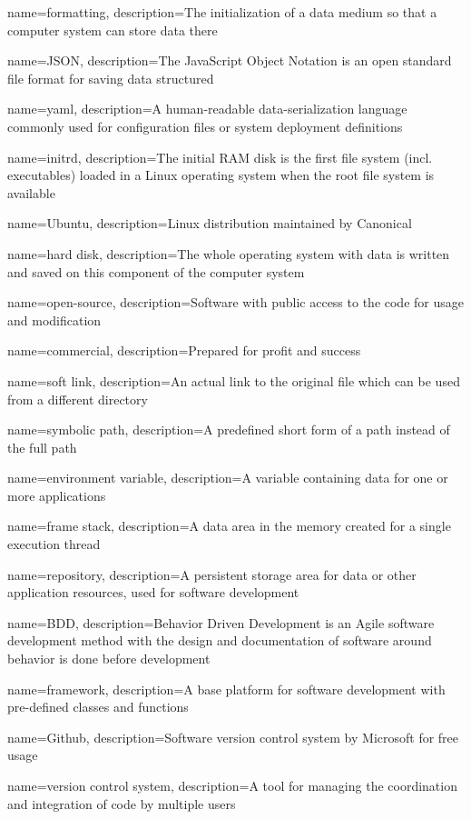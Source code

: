{
    name={formatting},
    description={The initialization of a data medium so that a computer system can store data there}
}

{
    name={JSON},
    description={The JavaScript Object Notation is an open standard file format for saving data structured}
}

{
    name={yaml},
    description={A human-readable data-serialization language commonly used for configuration files or system deployment definitions}
}

{
    name={initrd},
    description={The initial RAM disk is the first file system (incl. executables) loaded in a Linux operating system when the root file system is available}
}

{
    name={Ubuntu},
    description={Linux distribution maintained by Canonical}
}

{
    name={hard disk},
    description={The whole operating system with data is written and saved on this component of the computer system}
}

{
    name={open-source},
    description={Software with public access to the code for usage and modification}
}

{
    name={commercial},
    description={Prepared for profit and success}
}

{
    name={soft link},
    description={An actual link to the original file which can be used from a different directory}
}

{
    name={symbolic path},
    description={A predefined short form of a path instead of the full path}
}

{
    name={environment variable},
    description={A variable containing data for one or more applications}
}

{
    name={frame stack},
    description={A data area in the memory created for a single execution thread}
}

{
    name={repository},
    description={A persistent storage area for data or other application resources, used for software development}
}


{
    name={BDD},
    description={Behavior Driven Development is an Agile software development method with the design and documentation of software around behavior is done before development}
}

{
    name={framework},
    description={A base platform for software development with pre-defined classes and functions}
}


{
    name={Github},
    description={Software version control system by Microsoft for free usage}
}

{
    name={version control system},
    description={A tool for managing the coordination and integration of code by multiple users}
}


\glsaddall
